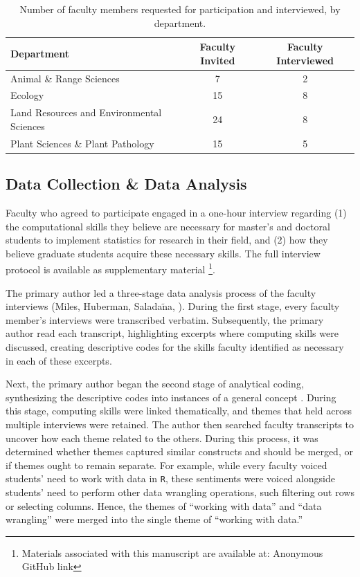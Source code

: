 \documentclass[12pt]{article}
\begin{document}
{
\begin{table}[h!]
\centering
\begin{tabular}{lcc}
\hline
Department & Faculty Invited & Faculty Interviewed  \\
\hline
Animal \& Range Sciences & 7 & 2 \\
Ecology & 15 & 8 \\
Land Resources and Environmental Sciences & 24 & 8 \\
Plant Sciences \& Plant Pathology &  15 & 5 \\ 
\hline
\end{tabular}
\caption{Number of faculty members requested for participation and interviewed,
by department.}
\label{tab:faculty}
\end{table}
}

\subsection{Data Collection \& Data Analysis}  

\noindent Faculty who agreed to participate engaged in a one-hour 
interview regarding (1) the computational skills they believe are necessary for
master's and doctoral students to implement statistics for research in their
field, and (2) how they believe graduate students acquire these necessary
skills. The full interview protocol is available as supplementary material
\footnote{Materials associated with this manuscript are available at: 
Anonymous GitHub link}.


\quad The primary author led a three-stage data analysis process of the faculty
interviews (Miles, Huberman, Salada$\tilde{\text{n}}$a, \citeyear{miles}). 
During the first stage, every faculty member's interviews were transcribed
verbatim. Subsequently, the primary author read each transcript, highlighting
excerpts where computing skills were discussed, creating descriptive codes for
the skills faculty identified as necessary in each of these excerpts. 

\quad Next, the primary author began the second stage of analytical coding,
synthesizing the descriptive codes into instances of a general concept 
\citep[p.\ 95]{miles}. During this stage, computing skills were linked
thematically, and themes that held across multiple interviews were retained.
The author then searched faculty transcripts to uncover how each theme related
to the others. During this process, it was determined whether themes captured
similar constructs and should be merged, or if themes ought to remain separate. 
For example, while every faculty voiced students' need to work with data in 
\texttt{R}, these sentiments were voiced alongside students' need to perform
other data wrangling operations, such filtering out rows or selecting columns. 
Hence, the themes of ``working with data'' and ``data wrangling'' were merged
into the single theme of ``working with data.'' 
\end{document}
